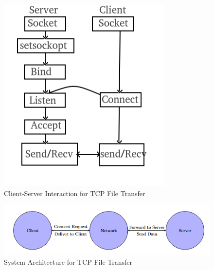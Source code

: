 \documentclass{article}
\begin{document}
\begin{figure}
    \centering
    \includegraphics[width=1\linewidth]{Socket_server-1-modified.png}
    \caption{Client-Server Interaction for TCP File Transfer}
    \label{fig:enter-label}
\end{figure}

\begin{figure}
    \centering
    \includegraphics[width=1\linewidth]{system_architecture.png}
    \caption{System Architecture for TCP File Transfer}
    \label{fig:enter-label}
\end{figure}
\end{document}
